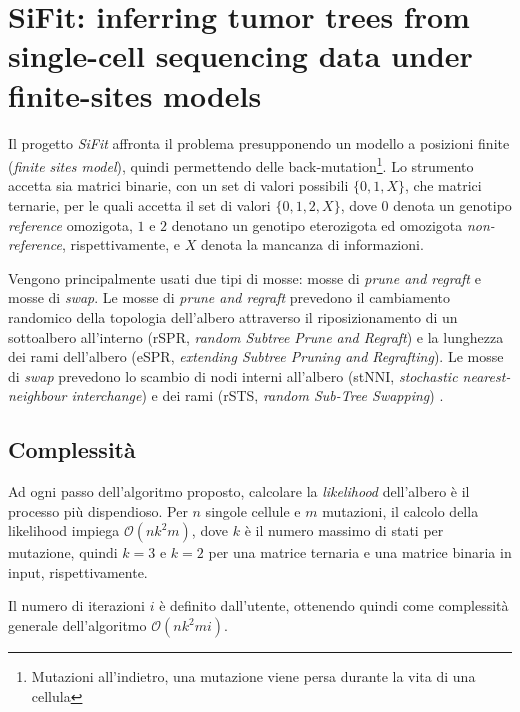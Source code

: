 \section{SiFit: inferring tumor trees from single-cell sequencing data under finite-sites models \cite{sifit}}
\label{chap:art-sifit}
Il progetto \textit{SiFit} affronta il problema presupponendo un modello a posizioni finite (\textit{finite sites model}), quindi permettendo delle back-mutation\footnote{Mutazioni all'indietro, una mutazione viene persa durante la vita di una cellula}.
Lo strumento accetta sia matrici binarie, con un set di valori possibili $\{ 0, 1, X \}$, che matrici ternarie, per le quali accetta il set di valori $\{ 0, 1, 2, X \}$, dove $0$ denota un genotipo \textit{reference} omozigota, $1$ e $2$ denotano un genotipo eterozigota ed omozigota \textit{non-reference}, rispettivamente, e $X$ denota la mancanza di informazioni.

Vengono principalmente usati due tipi di mosse: mosse di \textit{prune and regraft} e mosse di \textit{swap}. Le mosse di \textit{prune and regraft} prevedono il cambiamento randomico della topologia dell'albero attraverso il riposizionamento di un sottoalbero all'interno (rSPR, \textit{random Subtree Prune and Regraft}) e la lunghezza dei rami dell'albero (eSPR, \textit{extending Subtree Pruning and Regrafting}). Le mosse di \textit{swap} prevedono lo scambio di nodi interni all'albero (stNNI, \textit{stochastic nearest-neighbour interchange}) e dei rami (rSTS, \textit{random Sub-Tree Swapping}) \cite{sifit, efficiencymcmc}.

\subsection{Complessità}
Ad ogni passo dell'algoritmo proposto, calcolare la \textit{likelihood} dell'albero è il processo più dispendioso. Per $n$ singole cellule e $m$ mutazioni, il calcolo della likelihood impiega $\mathcal{O} (nk^2m)$, dove $k$ è il numero massimo di stati per mutazione, quindi $k = 3$ e $k = 2$ per una matrice ternaria e una matrice binaria in input, rispettivamente.

Il numero di iterazioni $i$ è definito dall'utente, ottenendo quindi come complessità generale dell'algoritmo $\mathcal{O}(nk^2mi)$.

